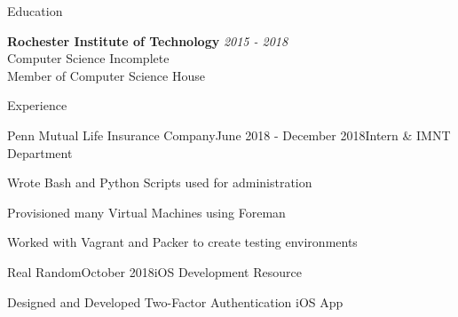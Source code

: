 \documentclass{resume} %
\begin{document}

\begin{rSection}{Education}

{\bf Rochester Institute of Technology} \hfill {\em 2015 - 2018} 
\\ Computer Science \hfill {Incomplete} \\
Member of Computer Science House \\

\end{rSection}

\begin{rSection}{Experience}

\begin{rSubsection}{Penn Mutual Life Insurance Company}{June 2018 - December 2018}{Intern \& IMNT Department}{}
\item Wrote Bash and Python Scripts used for administration
\item Provisioned many Virtual Machines using Foreman 
\item Worked with Vagrant and Packer to create testing environments
\end{rSubsection}



\begin{rSubsection}{Real Random}{October 2018}{iOS Development Resource}{}
\item Designed and Developed Two-Factor Authentication iOS App
\end{rSubsection}

\end{rSection}


\end{document}
